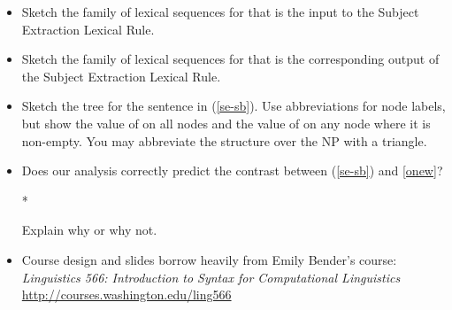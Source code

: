 \documentclass[a4paper,landscape,headrule,footrule]{foils}
\begin{document}
\begin{itemize}
\item [A.] Sketch the family of lexical sequences for  that is the input
to the Subject Extraction Lexical Rule.

\item [B.] Sketch the family of lexical sequences for  that is the
corresponding output of the Subject Extraction Lexical Rule.


\item[C.] Sketch the %
tree for the sentence in (\ref{se-sb}).
Use abbreviations for node labels, but show the value of  on
all nodes and the value of  on any node where it is non-empty.
You may abbreviate the structure over the NP  with a triangle.

\item[D.] Does our analysis correctly predict the contrast between
(\ref{se-sb}) and \ref{onew}?\\
\begin{exe}
  \ex \label{onew} *
\end{exe}
Explain why or why not.
\end{itemize}

% 


\begin{itemize}
\item Course design and slides borrow heavily from Emily Bender's course:
\textit{Linguistics 566: Introduction to Syntax for Computational Linguistics}
\\ \url{http://courses.washington.edu/ling566}
\end{itemize}




\end{document}
